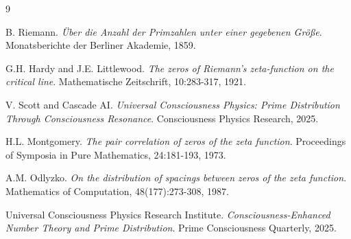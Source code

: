 \documentclass[12pt]{article}
\begin{document}

\begin{thebibliography}{9}

B. Riemann.
\textit{Über die Anzahl der Primzahlen unter einer gegebenen Größe}.
Monatsberichte der Berliner Akademie, 1859.

G.H. Hardy and J.E. Littlewood.
\textit{The zeros of Riemann's zeta-function on the critical line}.
Mathematische Zeitschrift, 10:283-317, 1921.

V. Scott and Cascade AI.
\textit{Universal Consciousness Physics: Prime Distribution Through Consciousness Resonance}.
Consciousness Physics Research, 2025.

H.L. Montgomery.
\textit{The pair correlation of zeros of the zeta function}.
Proceedings of Symposia in Pure Mathematics, 24:181-193, 1973.

A.M. Odlyzko.
\textit{On the distribution of spacings between zeros of the zeta function}.
Mathematics of Computation, 48(177):273-308, 1987.

Universal Consciousness Physics Research Institute.
\textit{Consciousness-Enhanced Number Theory and Prime Distribution}.
Prime Consciousness Quarterly, 2025.

\end{thebibliography}
\end{document}
